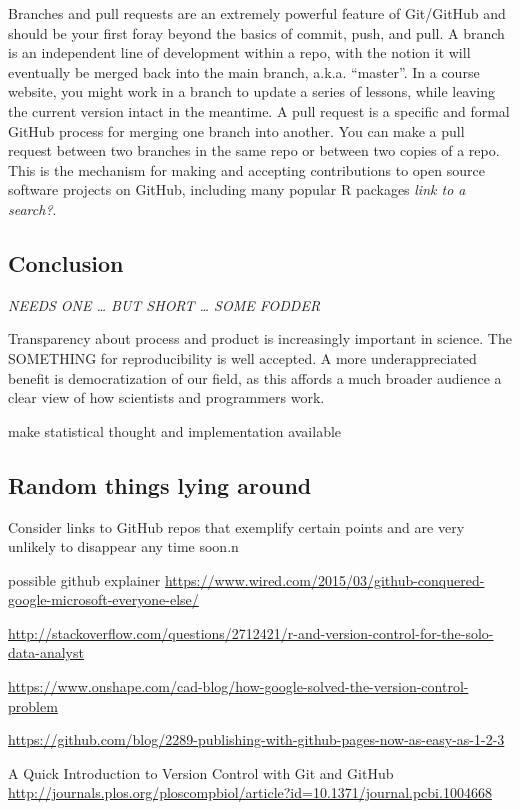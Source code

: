 \documentclass[12pt]{article}
\begin{document}
Branches and pull requests are an extremely powerful feature of
Git/GitHub and should be your first foray beyond the basics of commit,
push, and pull. A branch is an independent line of development within a
repo, with the notion it will eventually be merged back into the main
branch, a.k.a. ``master''. In a course website, you might work in a
branch to update a series of lessons, while leaving the current version
intact in the meantime. A pull request is a specific and formal GitHub
process for merging one branch into another. You can make a pull request
between two branches in the same repo or between two copies of a repo.
This is the mechanism for making and accepting contributions to open
source software projects on GitHub, including many popular R packages
\emph{link to a search?}.

\subsection{Conclusion}\label{conclusion}

\emph{NEEDS ONE \ldots{} BUT SHORT \ldots{} SOME FODDER}

Transparency about process and product is increasingly important in
science. The SOMETHING for reproducibility is well accepted. A more
underappreciated benefit is democratization of our field, as this
affords a much broader audience a clear view of how scientists and
programmers work.

make statistical thought and implementation available

\subsection{Random things lying
around}\label{random-things-lying-around}

Consider links to GitHub repos that exemplify certain points and are
very unlikely to disappear any time soon.n

possible github explainer
\url{https://www.wired.com/2015/03/github-conquered-google-microsoft-everyone-else/}

\url{http://stackoverflow.com/questions/2712421/r-and-version-control-for-the-solo-data-analyst}

\url{https://www.onshape.com/cad-blog/how-google-solved-the-version-control-problem}

\url{https://github.com/blog/2289-publishing-with-github-pages-now-as-easy-as-1-2-3}

A Quick Introduction to Version Control with Git and GitHub
\url{http://journals.plos.org/ploscompbiol/article?id=10.1371/journal.pcbi.1004668}
\end{document}
